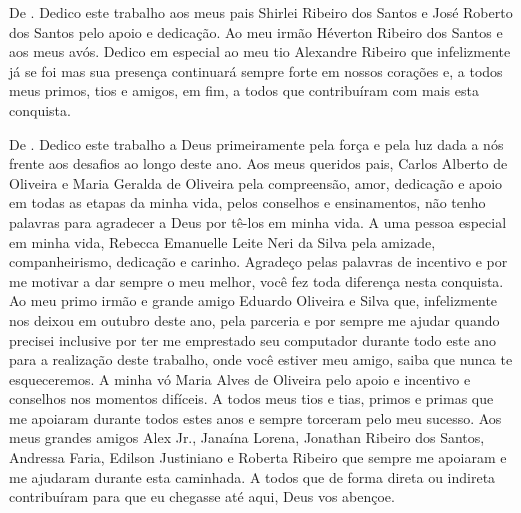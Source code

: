 \begin{dedicatoria}
\vspace*{\fill}
\vspace*{\fill}
\vspace*{\fill}
\vspace*{\fill}
\vspace*{\fill}
\vspace*{\fill}
De \imprimirAutorUm.
\newline
Dedico este trabalho aos meus pais Shirlei Ribeiro dos Santos e José Roberto dos
Santos pelo apoio e dedicação. Ao meu irmão Héverton Ribeiro dos Santos e aos
meus avós.
Dedico em especial ao meu tio Alexandre Ribeiro que infelizmente já se foi
mas sua presença continuará sempre forte em nossos corações e, a todos meus
primos, tios e amigos, em fim, a todos que contribuíram com mais esta conquista.

\vspace*{\fill}
De \imprimirAutorDois.
\newline
Dedico este trabalho a Deus primeiramente pela força e pela luz dada a nós frente aos desafios
ao longo deste ano. Aos meus queridos pais, Carlos Alberto de Oliveira e Maria Geralda de Oliveira pela
compreensão, amor, dedicação e apoio em todas as etapas da minha vida, pelos conselhos e ensinamentos, não tenho 
palavras para agradecer a Deus por tê-los em minha vida. A uma pessoa especial em minha vida, Rebecca Emanuelle 
Leite Neri da Silva pela amizade, companheirismo, dedicação e carinho. Agradeço pelas palavras de incentivo
e por me motivar a dar sempre o meu melhor, você fez toda diferença nesta conquista. Ao meu primo irmão e grande amigo Eduardo 
Oliveira e Silva que, infelizmente nos deixou em outubro deste ano, pela parceria e por sempre me ajudar quando precisei 
inclusive por ter me emprestado seu computador durante todo este ano para a realização deste trabalho, onde você estiver meu amigo, 
saiba que nunca te esqueceremos. A minha vó Maria Alves de Oliveira pelo apoio e incentivo e conselhos nos momentos 
difíceis. A todos meus tios e tias, primos e primas que me apoiaram durante todos estes anos e sempre torceram pelo meu 
sucesso. Aos meus grandes amigos Alex Jr., Janaína Lorena, Jonathan Ribeiro dos Santos, Andressa Faria, Edilson Justiniano 
e Roberta Ribeiro que sempre me apoiaram e me ajudaram durante esta caminhada. A todos que de forma direta ou indireta 
contribuíram para que eu chegasse até aqui, Deus vos abençoe.

\end{dedicatoria}
